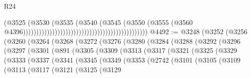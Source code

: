 \begin{lexlean}{R24}
\begin{coremodule}
{{{{{{{{{{{{{{{{{{{{{{{{{{{{{{{{{{{{{{{{{{{{{{{{{{{{{{{{{{{{{{{{{{{{{{{{{{{{{{{{{{{{{{{{{{{{{{{{{{{{{{{{{{{{{{{{{{{{{{{{{{{{{{{{{{{{{{{{{{{{{{{{{{{{{{{{{{{{{{{{{{{{{{{{{{{{{{{{{{{{{{{{{{{{{{{{{{{                                                                                  (@3525
                                                                                    (@3530
                                                                                      (@3535
                                                                                        (@3540
                                                                                          (@3545
                                                                                            (@3550
                                                                                              (@3555
                                                                                                (@3560
                                                                                                  @4396)))))))))))))))))))))))))))))))))))))))))))))))
@4492 := @3248
    (@3252
      (@3256
        (@3260
          (@3264
            (@3268
              (@3272
                (@3276
                  (@3280
                    (@3284
                      (@3288
                        (@3292
                          (@3296
                            (@3297
                              (@3301
                                (@891
                                  (@3305
                                    (@3309
                                      (@3313
                                        (@3317
                                          (@3321
                                            (@3325
                                              (@3329
                                                (@3333
                                                  (@3337
                                                    (@3341
                                                      (@3345
                                                        (@3349
                                                          (@3353
                                                            (@2742
                                                              (@3101
                                                                (@3105
                                                                  (@3109
                                                                    (@3113
                                                                      (@3117
                                                                        (@3121
                                                                          (@3125
                                                                            (@3129
}}}}}}}}}}}}}}}}}}}}}}}}}}}}}}}}}}}}}}}}}}}}}}}}}}}}}}}}}}}}}}}}}}}}}}}}}}}}}}}}}}}}}}}}}}}}}}}}}}}}}}}}}}}}}}}}}}}}}}}}}}}}}}}}}}}}}}}}}}}}}}}}}}}}}}}}}}}}}}}}}}}}}}}}}}}}}}}}}}}}}}}}}}}}}}}}}}}
\end{coremodule}
\end{lexlean}
